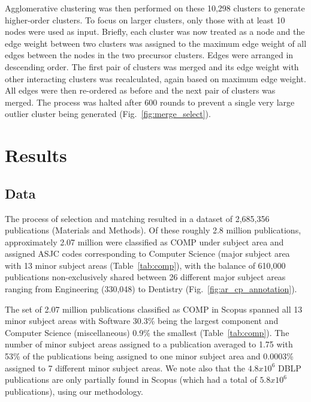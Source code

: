 Agglomerative clustering was then performed on these 10,298 clusters to generate higher-order clusters. To focus on larger clusters, only those with at least 10 nodes were used as input. Briefly, each cluster was now treated as a node and the edge weight between two clusters was assigned to the maximum edge weight of all edges between the nodes in the two precursor clusters. Edges were arranged in descending order. The first pair of clusters was merged and its edge weight with other interacting clusters was recalculated, again based on maximum edge weight. All edges were then re-ordered as before and the next pair of clusters was merged. The process was halted after 600 rounds to prevent a single very large outlier cluster being generated (Fig.~\ref{fig:merge_select}).

\section*{Results}
\label{sec:results}


\subsection{Data}
The process of selection and matching resulted in a dataset of 2,685,356 publications (Materials and Methods). 
Of these roughly 2.8 million publications, approximately 2.07 million were classified as COMP under subject area and assigned ASJC codes corresponding to Computer Science (major subject area with 13 minor subject areas (Table~\ref{tab:comp}), with the balance of 610,000 publications non-exclusively shared between 26 different major subject areas ranging from Engineering (330,048) to Dentistry (Fig.~\ref{fig:ar_cp_annotation}). 

The set of 2.07 million publications classified as COMP in Scopus spanned all 13 minor subject areas with Software 30.3\% being the largest component and Computer Science (miscellaneous) 0.9\% the smallest (Table~\ref{tab:comp}). The number of minor subject areas assigned to a publication averaged to 1.75 with 53\% of the publications being assigned to one minor subject area and 0.0003\% assigned to 7 different minor subject areas. 
We note also that  the $4.8x10^6$ DBLP publications are only partially found in Scopus (which had a total of $5.8x10^6$ publications), using our methodology.

